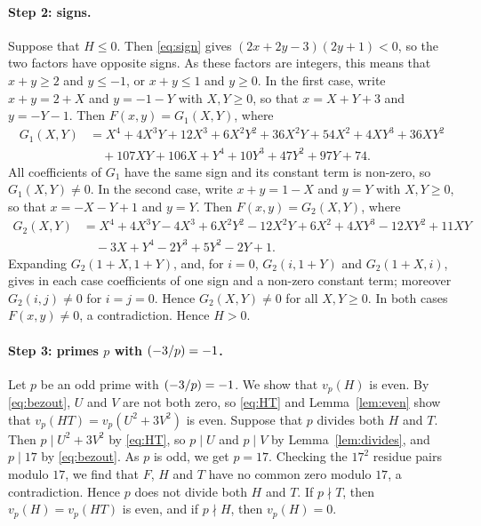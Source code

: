 \documentclass[11pt]{article}
\newcommand{\leg}[2]{\mathchoice{\biggl(\dfrac{#1}{#2}\biggr)}{(#1/#2)}{(#1/#2)}{(#1/#2)}}
\begin{document}
\paragraph{Step 2: signs.} Suppose that $H\leq0$. Then \eqref{eq:sign} gives $(2x+2y-3)(2y+1)<0$, so the two factors have opposite signs. As these factors are integers, this means that $x+y\geq2$ and $y\leq-1$, or $x+y\leq1$ and $y\geq0$. In the first case, write $x+y=2+X$ and $y=-1-Y$ with $X,Y\geq0$, so that $x=X+Y+3$ and $y=-Y-1$. Then $F(x,y)=G_{1}(X,Y)$, where
\begin{align*}
G_{1}(X,Y)&=X^{4}+4X^{3}Y+12X^{3}+6X^{2}Y^{2}+36X^{2}Y+54X^{2}+4XY^{3}+36XY^{2}\\
&\quad+107XY+106X+Y^{4}+10Y^{3}+47Y^{2}+97Y+74.
\end{align*}
All coefficients of $G_{1}$ have the same sign and its constant term is non-zero, so $G_{1}(X,Y)\neq0$. In the second case, write $x+y=1-X$ and $y=Y$ with $X,Y\geq0$, so that $x=-X-Y+1$ and $y=Y$. Then $F(x,y)=G_{2}(X,Y)$, where
\begin{align*}
G_{2}(X,Y)&=X^{4}+4X^{3}Y-4X^{3}+6X^{2}Y^{2}-12X^{2}Y+6X^{2}+4XY^{3}-12XY^{2}+11XY\\
&\quad-3X+Y^{4}-2Y^{3}+5Y^{2}-2Y+1.
\end{align*}
Expanding $G_{2}(1+X,1+Y)$, and, for $i=0$, $G_{2}(i,1+Y)$ and $G_{2}(1+X,i)$, gives in each case coefficients of one sign and a non-zero constant term; moreover $G_{2}(i,j)\neq0$ for $i=j=0$. Hence $G_{2}(X,Y)\neq0$ for all $X,Y\geq0$. In both cases $F(x,y)\neq0$, a contradiction. Hence $H>0$.

\paragraph{\texorpdfstring{Step 3: primes $p$ with $\leg{-3}{p}=-1$.}{Step 3: inert primes.}} Let $p$ be an odd prime with $\leg{-3}{p}=-1$. We show that $v_p(H)$ is even. By \eqref{eq:bezout}, $U$ and $V$ are not both zero, so \eqref{eq:HT} and Lemma~\ref{lem:even} show that $v_p(HT)=v_p(U^2+3V^2)$ is even. Suppose that $p$ divides both $H$ and $T$. Then $p\mid U^2+3V^2$ by \eqref{eq:HT}, so $p\mid U$ and $p\mid V$ by Lemma~\ref{lem:divides}, and $p\mid 17$ by \eqref{eq:bezout}. As $p$ is odd, we get $p=17$. Checking the $17^2$ residue pairs modulo $17$, we find that $F$, $H$ and $T$ have no common zero modulo $17$, a contradiction. Hence $p$ does not divide both $H$ and $T$. If $p\nmid T$, then $v_p(H)=v_p(HT)$ is even, and if $p\nmid H$, then $v_p(H)=0$.
\end{document}
